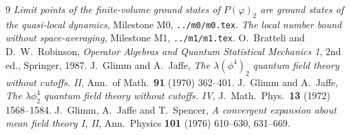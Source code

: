 \documentclass[11pt,a4paper]{article}
\theoremstyle{plain}
\theoremstyle{definition}
\begin{document}
\begin{thebibliography}{9}
 \emph{Limit points of the finite-volume ground states of $P(\varphi)_2$ are ground
states of the quasi-local dynamics}, Milestone M0, \texttt{../m0/m0.tex}.
 \emph{The local number bound without space-averaging}, Milestone M1,
\texttt{../m1/m1.tex}.
 O.~Bratteli and D.~W.~Robinson, \emph{Operator Algebras and Quantum Statistical
Mechanics 1}, 2nd ed., Springer, 1987.
 J.~Glimm and A.~Jaffe, \emph{The $\lambda(\phi^4)_2$ quantum field theory without
cutoffs. II}, Ann.\ of Math.\ \textbf{91} (1970) 362--401.
 J.~Glimm and A.~Jaffe, \emph{The $\lambda\phi^4_2$ quantum field theory without
cutoffs. IV}, J.\ Math.\ Phys.\ \textbf{13} (1972) 1568--1584.
 J.~Glimm, A.~Jaffe and T.~Spencer, \emph{A convergent expansion about mean field
theory I, II}, Ann.\ Physics \textbf{101} (1976) 610--630, 631--669.
\end{thebibliography}
\end{document}
